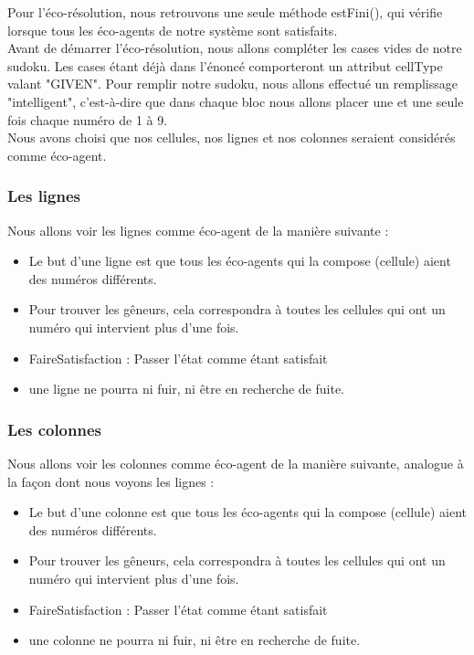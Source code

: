 	Pour l'éco-résolution, nous retrouvons une seule méthode estFini(), qui vérifie lorsque tous les éco-agents de notre système sont satisfaits. \\
	Avant de démarrer l'éco-résolution, nous allons compléter les cases vides de notre sudoku. Les cases étant déjà dans l'énoncé comporteront un attribut cellType valant "GIVEN". Pour remplir notre sudoku, nous allons effectué un remplissage "intelligent", c'est-à-dire que dans chaque bloc nous allons placer une et une seule fois chaque numéro de 1 à 9.\\
	Nous avons choisi que nos cellules, nos lignes et nos colonnes seraient considérés comme éco-agent. \\
	
	\subsubsection{Les lignes}
	Nous allons voir les lignes comme éco-agent de la manière suivante : \\
	\begin{itemize}
	\item Le but d'une ligne est que tous les éco-agents qui la compose (cellule) aient des numéros différents.
	\item Pour trouver les gêneurs, cela correspondra à toutes les cellules qui ont un numéro qui intervient plus d'une fois. 
	\item FaireSatisfaction : Passer l'état comme étant satisfait
	\item une ligne ne pourra ni fuir, ni être en recherche de fuite.   
	\end{itemize}
	
	\subsubsection{Les colonnes}
	Nous allons voir les colonnes comme éco-agent de la manière suivante, analogue à la façon dont nous voyons les lignes : \\
	\begin{itemize}
	\item Le but d'une colonne est que tous les éco-agents qui la compose (cellule) aient des numéros différents.
	\item Pour trouver les gêneurs, cela correspondra à toutes les cellules qui ont un numéro qui intervient plus d'une fois. 
	\item FaireSatisfaction : Passer l'état comme étant satisfait
	\item une colonne ne pourra ni fuir, ni être en recherche de fuite.   
	\end{itemize}
	

